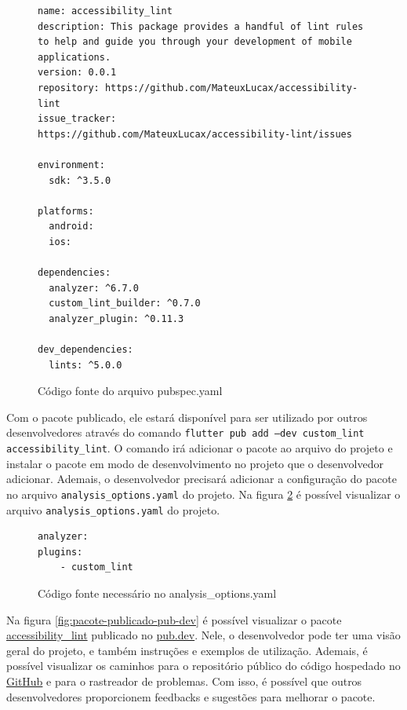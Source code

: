\begin{figure}[!htbp]
\centering
\caption{Código fonte do arquivo pubspec.yaml}\label{fig:pubspec-yaml}
\begin{lstlisting}
name: accessibility_lint
description: This package provides a handful of lint rules to help and guide you through your development of mobile applications.
version: 0.0.1
repository: https://github.com/MateuxLucax/accessibility-lint
issue_tracker: https://github.com/MateuxLucax/accessibility-lint/issues

environment:
  sdk: ^3.5.0

platforms:
  android:
  ios:

dependencies:
  analyzer: ^6.7.0
  custom_lint_builder: ^0.7.0
  analyzer_plugin: ^0.11.3

dev_dependencies:
  lints: ^5.0.0
\end{lstlisting}
\vspace{2mm}
\end{figure}

Com o pacote publicado, ele estará disponível para ser utilizado por outros desenvolvedores através do comando \texttt{flutter pub add --dev custom\_lint accessibility\_lint}. O comando irá adicionar o pacote ao arquivo  do projeto e instalar o pacote em modo de desenvolvimento no projeto que o desenvolvedor adicionar. Ademais, o desenvolvedor precisará adicionar a configuração do pacote no arquivo \texttt{analysis\_options.yaml} do projeto. Na figura \ref{fig:analysis-options-yaml} é possível visualizar o arquivo \texttt{analysis\_options.yaml} do projeto.

\begin{figure}[!htbp]
\centering
\caption{Código fonte necessário no analysis\_options.yaml}\label{fig:analysis-options-yaml}
\begin{lstlisting}
analyzer:
plugins:
	- custom_lint	
\end{lstlisting}
\vspace{2mm}
\end{figure}

Na figura \ref{fig:pacote-publicado-pub-dev} é possível visualizar o pacote \href{https://pub.dev/packages/accessibility_lint}{accessibility\_lint} publicado no \href{https://pub.dev/}{pub.dev}. Nele, o desenvolvedor pode ter uma visão geral do projeto, e também instruções e exemplos de utilização. Ademais, é possível visualizar os caminhos para o repositório público do código hospedado no \href{https://github.com/MateuxLucax/accessibility-lint}{GitHub} e para o rastreador de problemas. Com isso, é possível que outros desenvolvedores proporcionem feedbacks e sugestões para melhorar o pacote.

